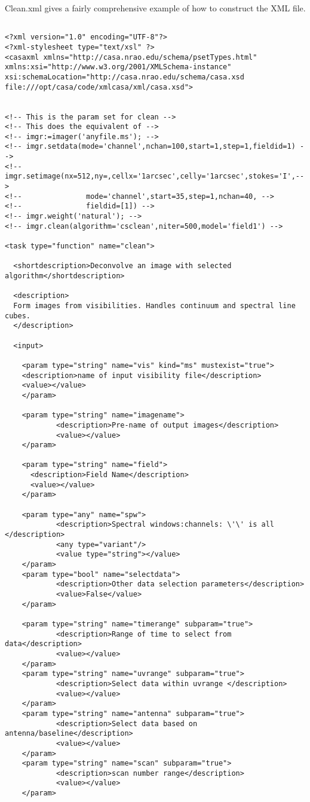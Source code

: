 Clean.xml gives a fairly comprehensive example of how to construct the
XML file. 
\begin{verbatim}

<?xml version="1.0" encoding="UTF-8"?>
<?xml-stylesheet type="text/xsl" ?>
<casaxml xmlns="http://casa.nrao.edu/schema/psetTypes.html"
xmlns:xsi="http://www.w3.org/2001/XMLSchema-instance"
xsi:schemaLocation="http://casa.nrao.edu/schema/casa.xsd
file:///opt/casa/code/xmlcasa/xml/casa.xsd">


<!-- This is the param set for clean -->
<!-- This does the equivalent of -->
<!-- imgr:=imager('anyfile.ms'); -->
<!-- imgr.setdata(mode='channel',nchan=100,start=1,step=1,fieldid=1) -->
<!-- imgr.setimage(nx=512,ny=,cellx='1arcsec',celly='1arcsec',stokes='I',-->
<!--               mode='channel',start=35,step=1,nchan=40, -->
<!--               fieldid=[1]) -->
<!-- imgr.weight('natural'); -->
<!-- imgr.clean(algorithm='csclean',niter=500,model='field1') -->

<task type="function" name="clean">

  <shortdescription>Deconvolve an image with selected algorithm</shortdescription>

  <description>
  Form images from visibilities. Handles continuum and spectral line cubes.
  </description>

  <input>

    <param type="string" name="vis" kind="ms" mustexist="true">
    <description>name of input visibility file</description>
    <value></value>
    </param>

    <param type="string" name="imagename">
            <description>Pre-name of output images</description>
            <value></value>
    </param>

    <param type="string" name="field">
      <description>Field Name</description>
      <value></value>
    </param>

    <param type="any" name="spw">
            <description>Spectral windows:channels: \'\' is all </description>
            <any type="variant"/>
            <value type="string"></value>
    </param>
    <param type="bool" name="selectdata">
            <description>Other data selection parameters</description>
            <value>False</value>
    </param>
    
    <param type="string" name="timerange" subparam="true">
            <description>Range of time to select from data</description>
            <value></value>
    </param>
    <param type="string" name="uvrange" subparam="true">
            <description>Select data within uvrange </description>
            <value></value>
    </param>
    <param type="string" name="antenna" subparam="true">
            <description>Select data based on antenna/baseline</description>
            <value></value>
    </param>
    <param type="string" name="scan" subparam="true">
            <description>scan number range</description>
            <value></value>
    </param>
    


\end{verbatim}
